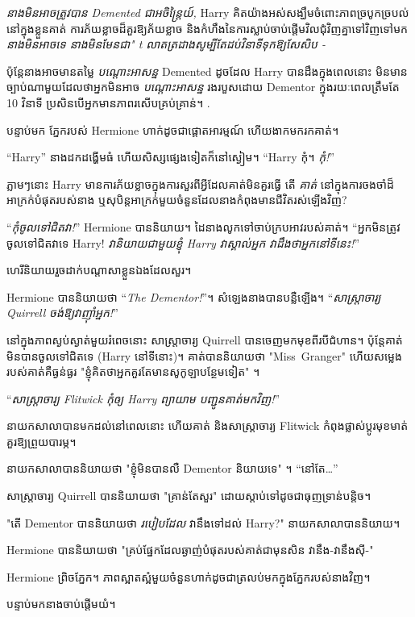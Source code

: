 \emph{នាងមិនអាចត្រូវបាន Demented ជាអចិន្ត្រៃយ៍,} Harry គិតយ៉ាងអស់សង្ឃឹមចំពោះភាពច្របូកច្របល់នៅក្នុងខ្លួនគាត់ ការភ័យខ្លាចដ៏គួរឱ្យភ័យខ្លាច និងកំហឹងនៃការស្លាប់ចាប់ផ្តើមវិលជុំវិញគ្នាទៅវិញទៅមក \emph{នាងមិនអាចទេ នាងមិនមែនជា" t លាតត្រដាងសូម្បីតែដប់វិនាទីទុកឱ្យសែសិប -}

ប៉ុន្តែនាងអាចមានតម្លៃ \emph{បណ្តោះអាសន្ន} Demented ដូចដែល Harry បានដឹងក្នុងពេលនោះ មិនមានច្បាប់ណាមួយដែលថាអ្នកមិនអាច \emph{បណ្តោះអាសន្ន} រងរបួសដោយ Dementor ក្នុងរយៈពេលត្រឹមតែ 10 វិនាទី ប្រសិនបើអ្នកមានភាពរសើបគ្រប់គ្រាន់។ .

បន្ទាប់មក ភ្នែករបស់ Hermione ហាក់ដូចជាផ្តោតអារម្មណ៍ ហើយងាកមករកគាត់។

“Harry” នាងដកដង្ហើមធំ ហើយសិស្សផ្សេងទៀតក៏នៅស្ងៀម។ “Harry កុំ។ \emph{កុំ!}”

ភ្លាមៗនោះ Harry មានការភ័យខ្លាចក្នុងការសួរពីអ្វីដែលគាត់មិនគួរធ្វើ តើ \emph{គាត់} នៅក្នុងការចងចាំដ៏អាក្រក់បំផុតរបស់នាង ឬសុបិន្តអាក្រក់មួយចំនួនដែលនាងកំពុងមានជីវិតរស់ឡើងវិញ?

“\emph{កុំចូលទៅជិតវា!}” Hermione បាននិយាយ។ ដៃ​នាង​លូក​ទៅ​ចាប់​ក្រប​អាវ​របស់​គាត់។ “អ្នកមិនត្រូវចូលទៅជិតវាទេ Harry! \emph{វានិយាយជាមួយខ្ញុំ Harry វាស្គាល់អ្នក វាដឹងថាអ្នកនៅទីនេះ!}”

ហេរី​និយាយ​រួច​ដាក់​បណ្តាសា​ខ្លួន​ឯង​ដែល​សួរ។

Hermione បាននិយាយថា “\emph{The Dementor!}”។ សំឡេង​នាង​បាន​បន្លឺ​ឡើង។ “\emph{សាស្រ្តាចារ្យ Quirrell ចង់ឱ្យវាញ៉ាំអ្នក!}”

នៅក្នុងភាពស្ងប់ស្ងាត់មួយរំពេចនោះ សាស្ត្រាចារ្យ Quirrell បានចេញមកមុខពីរបីជំហាន។ ប៉ុន្តែគាត់មិនបានចូលទៅជិតទេ (Harry នៅទីនោះ)។ គាត់បាននិយាយថា "Miss~Granger" ហើយសម្លេងរបស់គាត់គឺធ្ងន់ធ្ងរ "ខ្ញុំគិតថាអ្នកគួរតែមានសូកូឡាបន្ថែមទៀត" ។

“\emph{សាស្រ្តាចារ្យ Flitwick កុំឲ្យ Harry ព្យាយាម បញ្ជូនគាត់មកវិញ!}”

នាយក​សាលា​បាន​មក​ដល់​នៅ​ពេល​នោះ ហើយ​គាត់ និង​សាស្ត្រាចារ្យ Flitwick កំពុង​ផ្លាស់​ប្តូរ​មុខ​មាត់​គួរ​ឱ្យ​ព្រួយ​បារម្ភ។

នាយកសាលាបាននិយាយថា "ខ្ញុំមិនបានលឺ Dementor និយាយទេ" ។ “នៅតែ…”

សាស្រ្តាចារ្យ Quirrell បាននិយាយថា "គ្រាន់តែសួរ" ដោយស្តាប់ទៅដូចជាធុញទ្រាន់បន្តិច។

"តើ Dementor បាននិយាយថា \emph{របៀបដែល} វានឹងទៅដល់ Harry?" នាយកសាលាបាននិយាយ។

Hermione បាននិយាយថា "គ្រប់ផ្នែកដែលឆ្ងាញ់បំផុតរបស់គាត់ជាមុនសិន វានឹង-វានឹងស៊ី-"

Hermione ព្រិចភ្នែក។ ភាពស្អាតស្អំមួយចំនួនហាក់ដូចជាត្រលប់មកក្នុងភ្នែករបស់នាងវិញ។

បន្ទាប់មកនាងចាប់ផ្តើមយំ។


